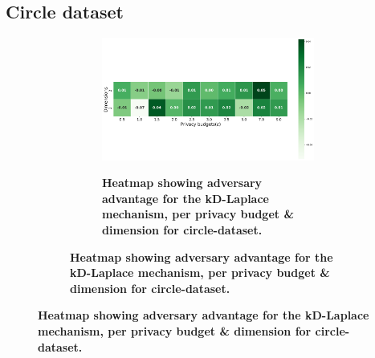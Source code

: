 {\newpage

\subsection{Circle dataset}
\begin{figure}[H]
  \centering
  \begin{subfigure}[b]{0.85\textwidth}
    \begin{subfigure}[c]{1\textwidth}
      \caption{\textbf{Heatmap showing adversary advantage for the kD-Laplace mechanism, per privacy budget \& dimension for circle-dataset.}}
      \includegraphics[width=1\textwidth]{Results/nd-laplace/nd-Laplace/circle-dataset/attack_adv.png}
      \label{fig:privacy_circle-dataset_adversial_advantage_kd-laplace}
    \end{subfigure}
    \vfill %


\end{subfigure}
\end{figure}}
